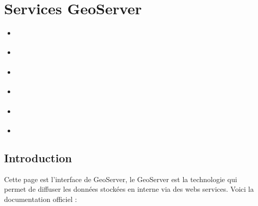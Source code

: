 \documentclass[letterpaper,10pt,french]{sphinxmanual}
\begin{document}
\section{Services \sphinxhyphen{} GeoServer}
\label{\detokenize{doc_admin/services:services-geoserver}}\label{\detokenize{doc_admin/services::doc}}
\begin{sphinxShadowBox}
\begin{itemize}
\item {} 
\sphinxAtStartPar
{}\label{\detokenize{doc_admin/services:id1}}{\hyperref[\detokenize{doc_admin/services:introduction}]{}}

\item {} 
\sphinxAtStartPar
{}\label{\detokenize{doc_admin/services:id2}}{\hyperref[\detokenize{doc_admin/services:les-donnees-stockees-en-interne}]{}}

\item {} 
\sphinxAtStartPar
{}\label{\detokenize{doc_admin/services:id3}}{\hyperref[\detokenize{doc_admin/services:la-diffusion-des-donnees-avec-les-flux-ogc}]{}}

\item {} 
\sphinxAtStartPar
{}\label{\detokenize{doc_admin/services:id4}}{\hyperref[\detokenize{doc_admin/services:definir-des-styles-pour-les-flux-wms}]{}}

\item {} 
\sphinxAtStartPar
{}\label{\detokenize{doc_admin/services:id5}}{\hyperref[\detokenize{doc_admin/services:la-restriction-d-acces-aux-donnees}]{}}

\item {} 
\sphinxAtStartPar
{}\label{\detokenize{doc_admin/services:id6}}{\hyperref[\detokenize{doc_admin/services:la-restriction-d-acces-aux-services}]{}}

\end{itemize}
\end{sphinxShadowBox}


\subsection{Introduction}
\label{\detokenize{doc_admin/services:introduction}}
\sphinxAtStartPar
Cette page est l’interface de GeoServer, le GeoServer est la technologie qui permet de diffuser les données stockées en interne via des webs services.
Voici la documentation officiel :
\end{document}
